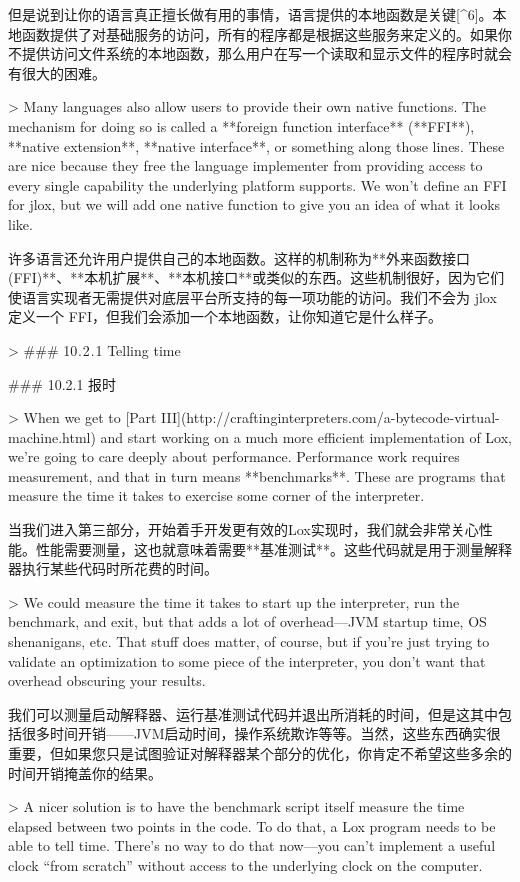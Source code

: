 \documentclass[cn,11pt,chinese]{elegantbook}
\begin{document}
{但是说到让你的语言真正擅长做有用的事情，语言提供的本地函数是关键[^6]。本地函数提供了对基础服务的访问，所有的程序都是根据这些服务来定义的。如果你不提供访问文件系统的本地函数，那么用户在写一个读取和显示文件的程序时就会有很大的困难。

> Many languages also allow users to provide their own native functions. The mechanism for doing so is called a **foreign function interface** (**FFI**), **native extension**, **native interface**, or something along those lines. These are nice because they free the language implementer from providing access to every single capability the underlying platform supports. We won’t define an FFI for jlox, but we will add one native function to give you an idea of what it looks like.

许多语言还允许用户提供自己的本地函数。这样的机制称为**外来函数接口(FFI)**、**本机扩展**、**本机接口**或类似的东西。这些机制很好，因为它们使语言实现者无需提供对底层平台所支持的每一项功能的访问。我们不会为 jlox 定义一个 FFI，但我们会添加一个本地函数，让你知道它是什么样子。

> ### 10 . 2 . 1 Telling time

### 10.2.1 报时

> When we get to [Part III](http://craftinginterpreters.com/a-bytecode-virtual-machine.html) and start working on a much more efficient implementation of Lox, we’re going to care deeply about performance. Performance work requires measurement, and that in turn means **benchmarks**. These are programs that measure the time it takes to exercise some corner of the interpreter.

当我们进入第三部分，开始着手开发更有效的Lox实现时，我们就会非常关心性能。性能需要测量，这也就意味着需要**基准测试**。这些代码就是用于测量解释器执行某些代码时所花费的时间。

> We could measure the time it takes to start up the interpreter, run the benchmark, and exit, but that adds a lot of overhead—JVM startup time, OS shenanigans, etc. That stuff does matter, of course, but if you’re just trying to validate an optimization to some piece of the interpreter, you don’t want that overhead obscuring your results.

我们可以测量启动解释器、运行基准测试代码并退出所消耗的时间，但是这其中包括很多时间开销——JVM启动时间，操作系统欺诈等等。当然，这些东西确实很重要，但如果您只是试图验证对解释器某个部分的优化，你肯定不希望这些多余的时间开销掩盖你的结果。

> A nicer solution is to have the benchmark script itself measure the time elapsed between two points in the code. To do that, a Lox program needs to be able to tell time. There’s no way to do that now—you can’t implement a useful clock “from scratch” without access to the underlying clock on the computer.

}
\end{document}
